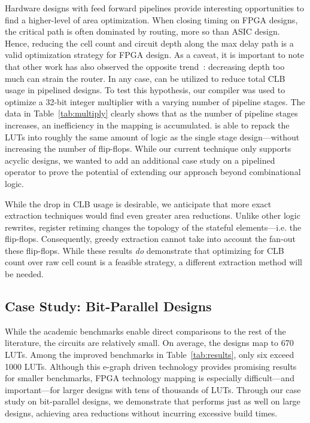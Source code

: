 Hardware designs with feed forward pipelines provide interesting opportunities
to find a higher-level of area optimization. When closing timing on FPGA
designs, the critical path is often dominated by routing, more so than ASIC
design. Hence, reducing the cell count and circuit depth along the max delay
path is a valid optimization strategy for FPGA design. As a caveat, it is
important to note that other work has also observed the opposite
trend~\cite{academicfpga}: decreasing depth too much can strain the router. In
any case, \shortname{} can be utilized to reduce total CLB usage in pipelined
designs. To test this hypothesis, our compiler was used to optimize a 32-bit
integer multiplier with a varying number of pipeline stages. The data in
Table~\ref{tab:multiply} clearly shows that as the number of pipeline stages
increases, an inefficiency in the mapping is accumulated. \shortname{} is able
to repack the LUTs into roughly the same amount of logic as the single stage
design---without increasing the number of flip-flops. While our current
technique only supports acyclic designs, we wanted to add an additional case
study on a pipelined operator to prove the potential of extending our approach
beyond combinational logic.

While the drop in CLB usage is desirable, we anticipate that more exact
extraction techniques would find even greater area reductions. Unlike other
logic rewrites, register retiming changes the topology of the stateful
elements---i.e. the flip-flops. Consequently, greedy extraction cannot take
into account the fan-out these flip-flops. While these results \textit{do}
demonstrate that optimizing for CLB count over raw cell count is a feasible
strategy, a different extraction method will be needed.

\subsection{Case Study: Bit-Parallel Designs}\label{sec:results:scalability}

While the academic benchmarks enable direct comparisons to the rest of the
literature, the circuits are relatively small. On average, the designs map to
670 LUTs. Among the \nimproved{} improved benchmarks in
Table~\ref{tab:results}, only six exceed 1000 LUTs. Although this e-graph
driven technology provides promising results for smaller benchmarks, FPGA
technology mapping is especially difficult---and important---for larger designs
with tens of thousands of LUTs. Through our case study on bit-parallel designs,
we demonstrate that \shortname{} performs just as well on large designs,
achieving area reductions without incurring excessive build times.

